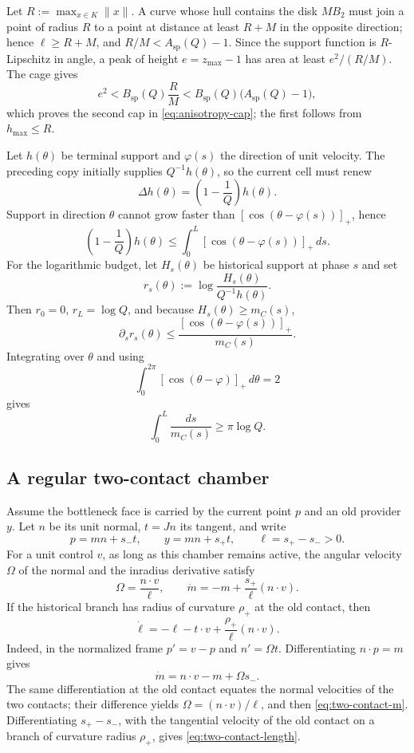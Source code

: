 \documentclass[10pt,a4paper]{article}
\theoremstyle{definition}
\theoremstyle{remark}
\newcommand{\norm}[1]{\lVert #1\rVert}
\begin{document}
Let $R:=\max_{x\in K}\norm{x}$. A curve whose hull contains the disk $MB_2$ must join a point of radius $R$ to a point at distance at least $R+M$ in the opposite direction; hence $\ell\ge R+M$, and $R/M<A_{\mathrm{sp}}(Q)-1$. Since the support function is $R$-Lipschitz in angle, a peak of height $e=z_{\max}-1$ has area at least $e^2/(R/M)$. The cage gives
\[
e^2<B_{\mathrm{sp}}(Q)\frac{R}{M}
<B_{\mathrm{sp}}(Q)\bigl(A_{\mathrm{sp}}(Q)-1\bigr),
\]
which proves the second cap in \eqref{eq:anisotropy-cap}; the first follows from $h_{\max}\le R$.

Let $h(\theta)$ be terminal support and $\varphi(s)$ the direction of unit velocity. The preceding copy initially supplies $Q^{-1}h(\theta)$, so the current cell must renew
\[
\Delta h(\theta)=\left(1-\frac1Q\right)h(\theta).
\]
Support in direction $\theta$ cannot grow faster than $[\cos(\theta-\varphi(s))]_+$, hence
\begin{equation}
\left(1-\frac1Q\right)h(\theta)
\le\int_0^L[\cos(\theta-\varphi(s))]_+\,ds.
\label{eq:directional-renewal}
\end{equation}
For the logarithmic budget, let $H_s(\theta)$ be historical support at phase $s$ and set
\[
r_s(\theta):=\log\frac{H_s(\theta)}{Q^{-1}h(\theta)}.
\]
Then $r_0=0$, $r_L=\log Q$, and because $H_s(\theta)\ge m_C(s)$,
\[
\partial_s r_s(\theta)
\le\frac{[\cos(\theta-\varphi(s))]_+}{m_C(s)}.
\]
Integrating over $\theta$ and using
\[
\int_0^{2\pi}[\cos(\theta-\varphi)]_+\,d\theta=2
\]
gives
\begin{equation}
\int_0^L\frac{ds}{m_C(s)}\ge\pi\log Q.
\label{eq:log-budget}
\end{equation}

\subsection{A regular two-contact chamber}
Assume the bottleneck face is carried by the current point $p$ and an old provider $y$. Let $n$ be its unit normal, $t=Jn$ its tangent, and write
\[
p=mn+s_-t,
\qquad
y=mn+s_+t,
\qquad
\ell=s_+-s_->0.
\]
For a unit control $v$, as long as this chamber remains active, the angular velocity $\Omega$ of the normal and the inradius derivative satisfy
\begin{equation}
\Omega=\frac{n\cdot v}{\ell},
\qquad
\dot m=-m+\frac{s_+}{\ell}(n\cdot v).
\label{eq:two-contact-m}
\end{equation}
If the historical branch has radius of curvature $\rho_+$ at the old contact, then
\begin{equation}
\dot\ell=-\ell-t\cdot v+\frac{\rho_+}{\ell}(n\cdot v).
\label{eq:two-contact-length}
\end{equation}
Indeed, in the normalized frame $p'=v-p$ and $n'=\Omega t$. Differentiating $n\cdot p=m$ gives
\[
\dot m=n\cdot v-m+\Omega s_-.
\]
The same differentiation at the old contact equates the normal velocities of the two contacts; their difference yields $\Omega=(n\cdot v)/\ell$, and then \eqref{eq:two-contact-m}. Differentiating $s_+-s_-$, with the tangential velocity of the old contact on a branch of curvature radius $\rho_+$, gives \eqref{eq:two-contact-length}.
\end{document}
